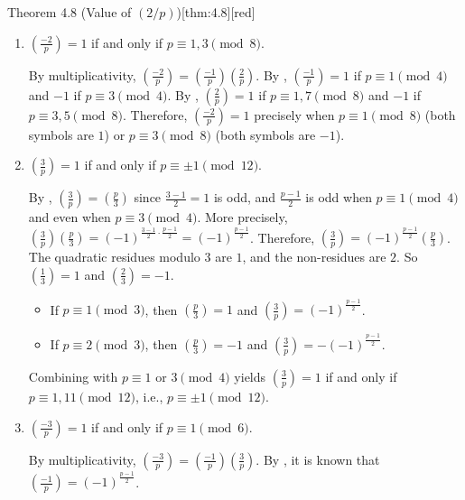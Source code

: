 \begin{enumerate}
\begin{define}{Theorem 4.8 (Value of $(2/p)$)}[thm:4.8][red]
  \end{define}
  \begin{enumerate}
    \item $\left(\frac{-2}{p}\right)=1$ if and only if $p \equiv 1,3\pmod{8}$.
    \begin{subprove}
      By multiplicativity, $\left(\frac{-2}{p}\right) = \left(\frac{-1}{p}\right)\left(\frac{2}{p}\right)$.
      By , $\left(\frac{-1}{p}\right) = 1$ if $p\equiv 1\pmod{4}$ and $-1$ if $p\equiv 3\pmod{4}$.
      By , $\left(\frac{2}{p}\right) = 1$ if $p\equiv 1,7\pmod{8}$ and $-1$ if $p\equiv 3,5\pmod{8}$.
      Therefore, $\left(\frac{-2}{p}\right) = 1$ precisely when $p\equiv 1\pmod{8}$ (both symbols are $1$) or $p\equiv 3\pmod{8}$ (both symbols are $-1$).
    \end{subprove}
    \item $\left(\frac{3}{p}\right)=1$ if and only if $p \equiv \pm 1\pmod{12}$.
    \begin{subprove}
      By , $\left(\frac{3}{p}\right) = \left(\frac{p}{3}\right)$ since $\frac{3-1}{2} = 1$ is odd, 
      and $\frac{p-1}{2}$ is odd when $p\equiv 1\pmod{4}$ and even when $p\equiv 3\pmod{4}$.
      More precisely, $\left(\frac{3}{p}\right)\left(\frac{p}{3}\right) = (-1)^{\frac{3-1}{2}\cdot\frac{p-1}{2}} = (-1)^{\frac{p-1}{2}}$. 
      Therefore, $\left(\frac{3}{p}\right) = (-1)^{\frac{p-1}{2}}\left(\frac{p}{3}\right)$.
      The quadratic residues modulo $3$ are $1$, and the non-residues are $2$. So $\left(\frac{1}{3}\right) = 1$ and $\left(\frac{2}{3}\right) = -1$.
      \begin{itemize}
        \item If $p\equiv 1\pmod{3}$, then $\left(\frac{p}{3}\right) = 1$ and $\left(\frac{3}{p}\right) = (-1)^{\frac{p-1}{2}}$.
        \item If $p\equiv 2\pmod{3}$, then $\left(\frac{p}{3}\right) = -1$ and $\left(\frac{3}{p}\right) = -(-1)^{\frac{p-1}{2}}$.
      \end{itemize}
      Combining with $p\equiv 1$ or $3\pmod{4}$ yields $\left(\frac{3}{p}\right) = 1$ if and only if $p\equiv 1,11\pmod{12}$, i.e., $p\equiv \pm 1\pmod{12}$.
    \end{subprove}
    \item $\left(\frac{-3}{p}\right)=1$ if and only if $p \equiv 1\pmod{6}$.
    \begin{subprove}
      By multiplicativity, $\left(\frac{-3}{p}\right) = \left(\frac{-1}{p}\right)\left(\frac{3}{p}\right)$.
      By , it is known that $\left(\frac{-1}{p}\right) = (-1)^{\frac{p-1}{2}}$.

\end{subprove}
\end{enumerate}
\end{enumerate}
